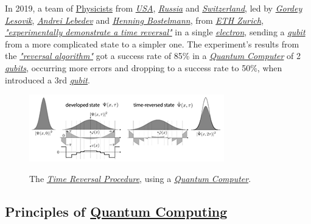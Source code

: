 \documentclass[conference]{IEEEtran}
\begin{document}
\vspace{4pt}

In 2019, a team of \href{https://en.wikipedia.org/wiki/Physicist}{Physicists} from \href{https://en.wikipedia.org/wiki/United_States}{\textit{USA}}, \href{https://en.wikipedia.org/wiki/Russia}{\textit{Russia}} and \href{https://en.wikipedia.org/wiki/Switzerland}{\textit{Switzerland}}, led by \href{https://www.researchgate.net/profile/Gordey_Lesovik}{\textit{Gordey Lesovik}}, \href{https://www.researchgate.net/profile/Andrey_Lebedev4}{\textit{Andrei Lebedev}} and \href{https://www.researchgate.net/profile/Henning_Bostelmann}{\textit{Henning Bostelmann}}, from \href{https://www.ethz.ch/en.html}{\textit{ETH Zurich}},  \href{https://en.wikipedia.org/wiki/Electron}{\textit{"experimentally demonstrate a time reversal"}} in a single \href{https://en.wikipedia.org/wiki/Electron}{\textit{electron}}, sending a \href{https://en.wikipedia.org/wiki/Qubit}{\textit{qubit}} from a more complicated state to a simpler one. The experiment's results from the \href{https://www.researchgate.net/publication/322160389_Arrow_of_time_and_its_reversal_on_IBM_quantum_computer}{\textit{"reversal algorithm"}} got a success rate of 85\% in a \href{https://en.wikipedia.org/wiki/Quantum_computing}{\textit{Quantum Computer}} of 2 \href{https://en.wikipedia.org/wiki/Qubit}{\textit{qubits}}, occurring more errors and dropping to a success rate to 50\%, when introduced a 3rd \href{https://en.wikipedia.org/wiki/Qubit}{\textit{qubit}}.\cite{b6}

\begin{center}
  \begin{figure}[htbp]
    \centerline{\href{https://www.nature.com/articles/s41598-019-40765-6}{\includegraphics{imgs/fig-1.png}}}
    \caption{The \href{https://www.nature.com/articles/s41598-019-40765-6}{\textit{Time Reversal Procedure}}, using a \href{https://en.wikipedia.org/wiki/Quantum_computing}{\textit{Quantum Computer}}.}
    \label{fig}
  \end{figure}
\end{center}

\newpage

\subsection{Principles of \href{https://en.wikipedia.org/wiki/Quantum_computing}{Quantum Computing}}\label{AA}
\end{document}
